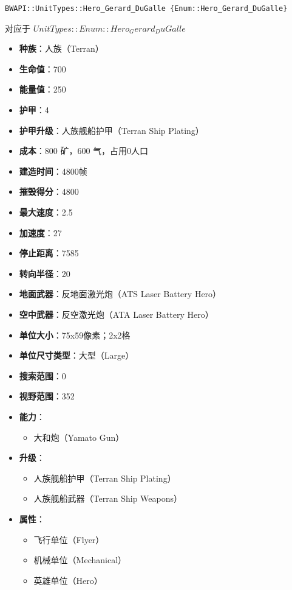 \begin{tcolorbox}[colback=white, colframe=black!60!white, title=Hero\_Gerard\_DuGalle(), arc=0mm]
    \begin{verbatim}
BWAPI::UnitTypes::Hero_Gerard_DuGalle {Enum::Hero_Gerard_DuGalle}
    \end{verbatim}
    对应于  $ UnitTypes::Enum::Hero_Gerard_DuGalle $ 
    \begin{itemize}
        \item \textbf{种族}：人族（Terran）
        \item \textbf{生命值}：700
        \item \textbf{能量值}：250
        \item \textbf{护甲}：4
        \item \textbf{护甲升级}：人族舰船护甲（Terran Ship Plating）
        \item \textbf{成本}：800 矿，600 气，占用0人口
        \item \textbf{建造时间}：4800帧
        \item \textbf{摧毁得分}：4800
        \item \textbf{最大速度}：2.5
        \item \textbf{加速度}：27
        \item \textbf{停止距离}：7585
        \item \textbf{转向半径}：20
        \item \textbf{地面武器}：反地面激光炮（ATS Laser Battery Hero）
        \item \textbf{空中武器}：反空激光炮（ATA Laser Battery Hero）
        \item \textbf{单位大小}：75x59像素；2x2格
        \item \textbf{单位尺寸类型}：大型（Large）
        \item \textbf{搜索范围}：0
        \item \textbf{视野范围}：352
        \item \textbf{能力}：
            \begin{itemize}
                \item 大和炮（Yamato Gun）
            \end{itemize}
        \item \textbf{升级}：
            \begin{itemize}
                \item 人族舰船护甲（Terran Ship Plating）
                \item 人族舰船武器（Terran Ship Weapons）
            \end{itemize}
        \item \textbf{属性}：
            \begin{itemize}
                \item 飞行单位（Flyer）
                \item 机械单位（Mechanical）
                \item 英雄单位（Hero）
            \end{itemize}
    \end{itemize}
    
\end{tcolorbox}

